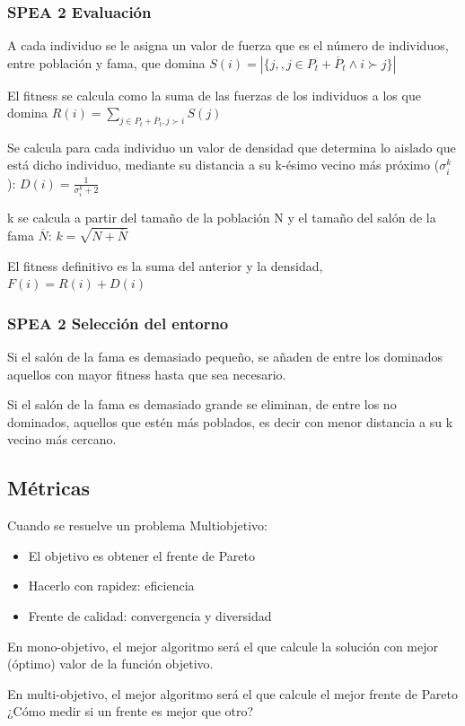 \documentclass[12pt, twoside, openright]{report} %
\begin{document}
\subsubsection{SPEA 2 Evaluación}
A cada individuo se le asigna un valor de fuerza que es el número de individuos, entre población y fama, que domina $S(i) = |\{j, , j \in P_t + \overline{P}_t \wedge i \succ j\}|$

El fitness se calcula como la suma de las fuerzas de los individuos a los que domina $R(i) = \sum_{j\in P_t+\overline{P}_t,j\succ i} S(j)$

Se calcula para cada individuo un valor de densidad que determina lo aislado que está dicho individuo, mediante su distancia a su k-ésimo vecino más próximo ($\sigma_i^k$): $D(i)= \frac{1}{\sigma^k_i + 2}$

k se calcula a partir del tamaño de la población N y el tamaño del salón de la fama $\overline{N}$: $k = \sqrt{N+\overline{N}}$

El fitness definitivo es la suma del anterior y la densidad, $F(i) = R(i) + D(i)$

\subsubsection{SPEA 2 Selección del entorno}
Si el salón de la fama es demasiado pequeño, se añaden de entre los dominados aquellos con mayor fitness hasta que sea necesario.

Si el salón de la fama es demasiado grande se eliminan, de entre los no dominados, aquellos que estén más poblados, es decir con menor distancia a su k vecino más cercano.
\pagebreak
\subsection{Métricas}
Cuando se resuelve un problema Multiobjetivo:
\begin{itemize}
	\item El objetivo es obtener el frente de Pareto
	\item Hacerlo con rapidez: eficiencia
	\item Frente de calidad: convergencia y diversidad
\end{itemize}
En mono-objetivo, el mejor algoritmo será el que calcule la solución con mejor (óptimo) valor de la función objetivo.

En multi-objetivo, el mejor algoritmo será el que calcule el mejor frente de Pareto ¿Cómo medir si un frente es mejor que otro?
\end{document}
